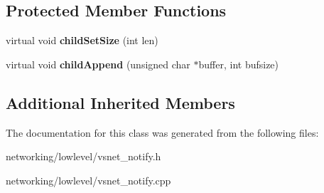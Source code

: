 \subsection*{Protected Member Functions}
\begin{DoxyCompactItemize}
\item 
virtual void {\bfseries child\+Set\+Size} (int len)\hypertarget{classVsnetDownload_1_1Client_1_1Buffer_ab53a0507466304695b1681bccd78aef2}{}\label{classVsnetDownload_1_1Client_1_1Buffer_ab53a0507466304695b1681bccd78aef2}

\item 
virtual void {\bfseries child\+Append} (unsigned char $\ast$buffer, int bufsize)\hypertarget{classVsnetDownload_1_1Client_1_1Buffer_a22e4c05001a7f3ecdff9441f3ded78f7}{}\label{classVsnetDownload_1_1Client_1_1Buffer_a22e4c05001a7f3ecdff9441f3ded78f7}

\end{DoxyCompactItemize}
\subsection*{Additional Inherited Members}


The documentation for this class was generated from the following files\+:\begin{DoxyCompactItemize}
\item 
networking/lowlevel/vsnet\+\_\+notify.\+h\item 
networking/lowlevel/vsnet\+\_\+notify.\+cpp\end{DoxyCompactItemize}
